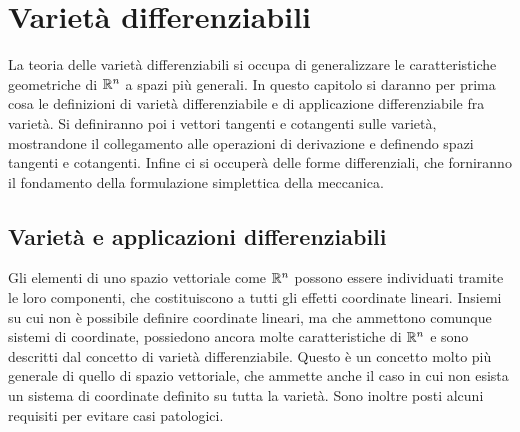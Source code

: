 \chapter{Varietà differenziabili}

La teoria delle varietà differenziabili si occupa di generalizzare le caratteristiche geometriche di $\mathbb{R}^n$ a spazi più generali. In questo capitolo si daranno per prima cosa le definizioni di varietà differenziabile e di applicazione differenziabile fra varietà. Si definiranno poi i vettori tangenti e cotangenti sulle varietà, mostrandone il collegamento alle operazioni di derivazione e definendo spazi tangenti e cotangenti. Infine ci si occuperà delle forme differenziali, che forniranno il fondamento della formulazione simplettica della meccanica.
\section{Varietà e applicazioni differenziabili} \label{sec:smoothMfd}
Gli elementi di uno spazio vettoriale come $\mathbb{R}^{n}$ possono essere individuati tramite le loro componenti, che costituiscono a tutti gli effetti coordinate lineari. Insiemi su cui non è possibile definire coordinate lineari, ma che ammettono comunque sistemi di coordinate, possiedono ancora molte caratteristiche di $\mathbb{R}^{n}$ e sono descritti dal concetto di varietà differenziabile. Questo è un concetto molto più generale di quello di spazio vettoriale, che ammette anche il caso in cui non esista un sistema di coordinate definito su tutta la varietà. Sono inoltre posti alcuni requisiti per evitare casi patologici.

